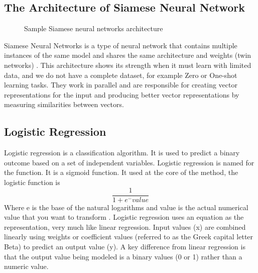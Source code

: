 \documentclass[12pt,oneside,openright,a4paper]{cpe-english-project}
\begin{document}
\subsection{The Architecture of Siamese Neural Network}
\begin{figure}[!h]
  \centering
  \setlength{\fboxrule}{0.2mm}
  \setlength{\fboxsep}{0.5cm}
  \caption{Sample Siamese neural networks architecture}
  \label{fig:siamese_arch}
\end{figure}
Siamese Neural Networks is a type of neural network that contains multiple instances of the
same model and shares the same architecture and weights (twin networks) \cite{what_is_embedding_matrix, how_to_predict_questions_pair_using_malstm, introduction_siamese_network}
. This architecture shows its strength when it must learn with limited data, and we do not have a complete dataset,
for example Zero or One-shot learning tasks. They work in parallel and are responsible for creating vector
representations for the input and producing better vector representations by measuring similarities between vectors.

\subsection{Logistic Regression}
Logistic regression is a classification algorithm.
It is used to predict a binary outcome based on a set of independent variables.
Logistic regression is named for the function. It is a sigmoid function.
It used at the core of the method, the logistic function is
\[\frac{1}{1 + e^-value}\]
Where e is the base of the natural logarithms and value is the actual numerical value that you want to transform \cite{lg}.
Logistic regression uses an equation as the representation, very much like linear regression. Input values (x) are combined linearly using weights or coefficient values (referred to as the Greek capital letter Beta) to predict an output value (y). A key difference from linear regression is that the output value being modeled is a binary values (0 or 1) rather than a numeric value.
\end{document}
